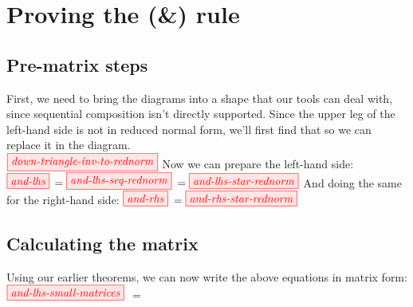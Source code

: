 \section{Proving the (\&) rule}

\subsection{Pre-matrix steps}
First, we need to bring the diagrams into a shape that our tools can deal with,
since sequential composition isn't directly supported. Since the upper leg of
the left-hand side is not in reduced normal form, we'll first find that so we
can replace it in the diagram.\\
$\tikzfig{down-triangle-inv-to-rednorm}$
Now we can prepare the left-hand side:\\
$\tikzfig{and-lhs}$ 
$= \tikzfig{and-lhs-seq-rednorm}$ 
$= \tikzfig{and-lhs-star-rednorm}$
And doing the same for the right-hand side:
$\tikzfig{and-rhs}$
$= \tikzfig{and-rhs-star-rednorm}$\\

\subsection{Calculating the matrix}
Using our earlier theorems, we can now write the above equations in matrix
form:\\
$\tikzfig{and-lhs-small-matrices}$
$= $
